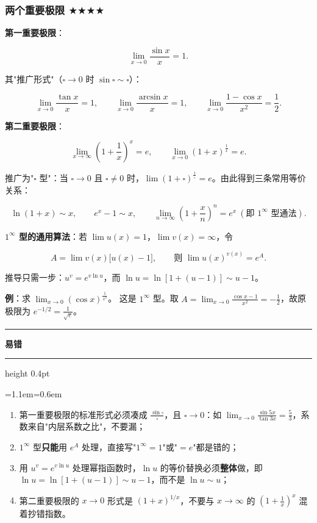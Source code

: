 \documentclass[11pt,openany,UTF8]{ctexbook}
\newcommand{\callouthead}[2]{%
  \par\addvspace{7pt}\noindent
  {\color{#1}\rule[-0.15em]{3pt}{1.05em}}\hspace{0.5em}%
  {\bfseries\color{#1}#2}\par\nobreak\vspace{-0.35em}%
  {\color{rulesep}\hrule height 0.4pt}\nobreak\vspace{0.45em}%
  \begingroup\small\setlength{\parindent}{0pt}%
  \leftskip=1.1em\rightskip=0.6em\noindent\ignorespaces}
\newcommand{\calloutend}{\par\endgroup\addvspace{7pt}}
\newenvironment{callwarn}[1]{\callouthead{warnbar}{#1}}{\calloutend}
\begin{document}
\subsubsection{两个重要极限 $\bigstar$$\bigstar$$\bigstar$$\bigstar$}

\textbf{第一重要极限}：

\[\lim_{x\to 0}\frac{\sin x}{x}=1 .\]

其"推广形式"（$\square\to 0$ 时 $\sin\square\sim\square$）：

\[\lim_{x\to 0}\frac{\tan x}{x}=1,\qquad \lim_{x\to 0}\frac{\arcsin x}{x}=1,\qquad \lim_{x\to 0}\frac{1-\cos x}{x^{2}}=\frac12 .\]

\textbf{第二重要极限}：

\[\lim_{x\to\infty}\left(1+\frac1x\right)^{x}=e,\qquad \lim_{x\to 0}(1+x)^{\frac1x}=e .\]

推广为"$\square$ 型"：当 $\square\to 0$ 且 $\square\ne 0$ 时，$\lim(1+\square)^{\frac{1}{\square}}=e$。由此得到三条常用等价关系：

\[\ln(1+x)\sim x,\qquad e^{x}-1\sim x,\qquad \lim_{n\to\infty}\left(1+\frac{x}{n}\right)^{n}=e^{x}\ (\text{即 } 1^\infty \text{ 型通法}).\]

\textbf{$1^{\infty}$ 型的通用算法}：若 $\lim u(x)=1$，$\lim v(x)=\infty$，令

\[A=\lim v(x)\bigl[u(x)-1\bigr],\qquad \text{则 } \lim u(x)^{v(x)}=e^{A}.\]

推导只需一步：$u^{v}=e^{v\ln u}$，而 $\ln u=\ln[1+(u-1)]\sim u-1$。

\textbf{例}：求 $\lim_{x\to 0}\left(\cos x\right)^{\frac{1}{x^{2}}}$。 这是 $1^\infty$ 型。取 $A=\lim_{x\to 0}\frac{\cos x-1}{x^{2}}=-\frac12$，故原极限为 $e^{-1/2}=\frac{1}{\sqrt e}$。

\begin{callwarn}{易错}
\begin{enumerate}
\item 第一重要极限的标准形式必须凑成 $\frac{\sin\square}{\square}$，且 $\square\to 0$：如 $\lim_{x\to 0}\frac{\sin 5x}{\tan 3x}=\frac{5}{3}$，系数来自"内层系数之比"，不要漏；
\item $1^\infty$ 型\textbf{只能}用 $e^{A}$ 处理，直接写"$1^\infty=1$"或"$=e$"都是错的；
\item 用 $u^{v}=e^{v\ln u}$ 处理幂指函数时，$\ln u$ 的等价替换必须\textbf{整体}做，即 $\ln u=\ln[1+(u-1)]\sim u-1$，而不是 $\ln u\sim u$；
\item 第二重要极限的 $x\to 0$ 形式是 $(1+x)^{1/x}$，不要与 $x\to\infty$ 的 $(1+\frac1x)^{x}$ 混着抄错指数。
\end{enumerate}
\end{callwarn}
\end{document}
